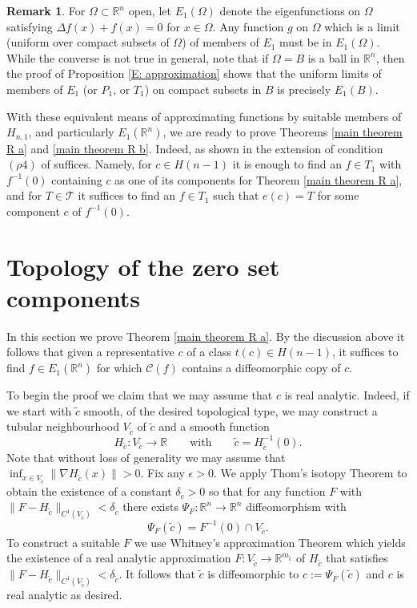 \documentclass[11pt,reqno]{amsart}
\newcommand{\R}{{\mathbb R}}
\newcommand{\ep}{\varepsilon}
\theoremstyle{definition}
\newtheorem{remark}{Remark}
\begin{document}
\begin{remark}
For $\Omega \subset \R^n$ open, let $E_1(\Omega)$ denote the eigenfunctions on $\Omega$ satisfying $\Delta f(x)+f(x)=0$ for $x \in \Omega$. Any function $g$ on $\Omega$ which is a limit (uniform over compact subsets of $\Omega$) of members of $E_1$ must be in $E_1(\Omega)$. While the converse is not true in general, note that if $\Omega=B$ is a ball in $\R^n$, then the proof of Proposition \ref{E: approximation} shows that the uniform limits of members of $E_1$ (or $P_1$, or $T_1$) on compact subsets in $B$ is precisely $E_1(B)$. 
\end{remark}

With these equivalent means of approximating functions by suitable members of $H_{n,1}$, and particularly $E_1(\R^n)$, we are ready to prove Theorems \ref{main theorem R a} and \ref{main theorem R b}. Indeed, as shown in \cite{SW} the extension of condition $(\rho 4)$ of \cite[Theorem 1]{NS2} suffices. Namely, for $c \in H(n-1)$ it is enough to find an $f \in T_1$ with $f^{-1}(0)$ containing $c$ as one of its components for Theorem \ref{main theorem R a}, and for $T \in \mathcal T$ it suffices to find an $f \in T_1$ such that $e(c)=T$ for some component $c$ of $f^{-1}(0)$.


\section{Topology of the zero set components}\label{topology}

In this section we prove Theorem \ref{main theorem R a}.
By the discussion  above it follows that given  a representative $c$ of a class $t(c) \in H(n-1)$,  it suffices to find $f \in E_1(\R^n)$  for which $\mathcal C(f)$ contains a diffeomorphic copy of $c$. 

To begin the proof we claim that we may assume that $c$ is real analytic. Indeed, if we start with $\tilde{c}$ smooth, of the desired topological type, we may construct a tubular neighbourhood $V_{\tilde c}$ of $\tilde {c}$  and a smooth  function 
$$H_{\tilde c}:V_{\tilde c} \to \R \qquad \text{with}\qquad \tilde c= H_{\tilde c}^{-1}(0).$$ Note that without loss of generality we may assume that   $\inf_{x \in V_{\tilde c}}\|\nabla H_{\tilde c}(x)\|>0$.
Fix any $\epsilon>0$. We apply Thom's isotopy Theorem \cite[Thm 20.2]{AR} to obtain the existence of a constant $\delta_{\tilde c}>0$ 
so that for any function $F$ with $\|F-H_{\tilde c}\|_{C^1(V_{\tilde c})} <\delta_{\tilde c}$ there exists $\Psi_{F} :\R^n \to \R^n$ diffeomorphism with
$$\Psi_{F}(\tilde c)= F^{-1}(0) \cap V_{\tilde c}.$$
To construct a suitable $F$ we use Whitney's approximation Theorem \cite[Lemma 6]{Wh} which yields the existence of a real analytic approximation $F:V_{\tilde c} \to \R^{m_{\tilde c}}$  of $H_{\tilde c}$ that satisfies $\|F-H_{\tilde c}\|_{C^1(V_{\tilde c})}< \delta_{\tilde c}$. It follows that $\tilde c$ is diffeomorphic to $c:=\Psi_{F}(\tilde c)$ and $c$ is real analytic as desired. 
\end{document}
